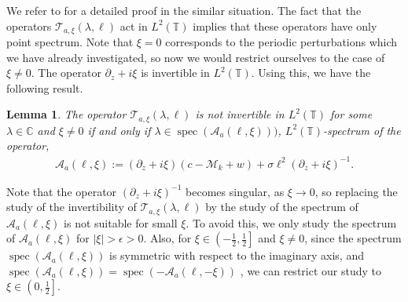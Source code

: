 \documentclass[12pt]{amsart}    %
\newcommand{\C}{\mathbb{C}}
\newcommand{\calM}{\mathcal{M}}
\newtheorem{lemma}[theorem]{Lemma}
\numberwithin{equation}{section}
\begin{document}
We refer to \cite[Lemma~5.1]{Haragus2011TransverseEquation} for a detailed proof in the similar situation.
The fact that the operators $\mathcal T_{a,\xi}(\lambda,\ell)$ act in $L^2(\mathbb{T})$ implies that these operators have only point spectrum. Note that $\xi=0$ corresponds to the periodic perturbations which we have already investigated, so now we would restrict ourselves to the case of $\xi\not=0$. The operator $\partial_z+i\xi$ is invertible in $L^2(\mathbb{T})$. Using this, we have the following result.
\begin{lemma}\label{lem:eq}
The operator $\mathcal T_{a,\xi}(\lambda,\ell)$ is not invertible in $L^2(\mathbb{T})$ for some $\lambda\in \C$ and $\xi\neq 0$ if and only if  $\lambda\in\operatorname{spec}(\mathcal A_a(\ell,\xi)))$, $L^2(\mathbb{T})$-spectrum of the operator,
\begin{align*}
    \mathcal{A}_a(\ell,\xi) := (\partial_z+i\xi)(c-\calM_k+w)+\sigma\ell^2(\partial_z+i\xi)^{-1}.
\end{align*}
\end{lemma}
Note that the operator $(\partial_z+i\xi)^{-1}$ becomes singular, as $\xi\to 0$, so replacing the study of the invertibility of $\mathcal T_{a,\xi}(\lambda,\ell)$ by the study of the spectrum of $\mathcal A_a(\ell,\xi)$ is not suitable for small $\xi$. To avoid this, we only study the spectrum of $\mathcal A_a(\ell,\xi)$ for $|\xi|>\epsilon>0$. Also, for $\xi\in\left(-\frac12,\frac12\right]$ and $\xi\not=0$, since the spectrum $\operatorname{spec}(\mathcal A_a(\ell,\xi))$ is symmetric with respect to the imaginary axis, and $\operatorname{spec}(\mathcal A_a(\ell,\xi))=\operatorname{spec}(-\mathcal A_a(\ell,-\xi))$ , we can restrict our study to $\xi\in\left(0,\frac12\right]$.
\end{document}

